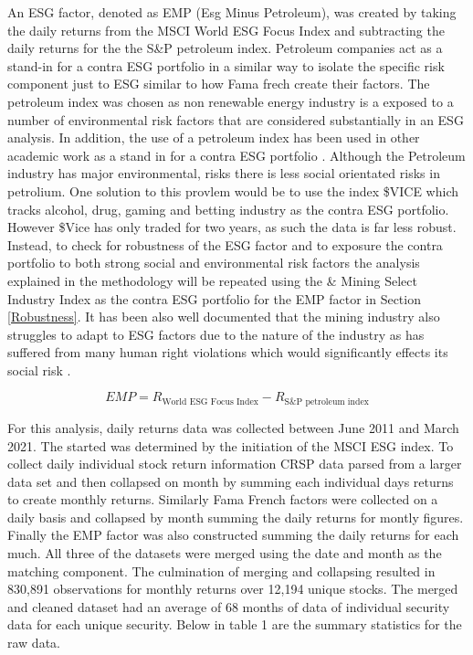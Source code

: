 \documentclass[12pt,oneside,reqno]{amsart}
\begin{document}
An ESG factor, denoted as EMP (Esg Minus Petroleum), was created by taking the daily returns from the MSCI World ESG Focus Index and subtracting the daily returns for the the  S\&P petroleum index. Petroleum companies act as a stand-in for a contra ESG portfolio in a similar way to isolate the specific risk component just to ESG similar to how Fama frech create their factors. The  petroleum index was chosen as non renewable energy industry is a exposed to a number of environmental risk factors that are considered substantially in an ESG analysis. In addition, the use of a petroleum index has been used in other academic work as a stand in for a contra ESG portfolio \cite{Frynas2005TheFD}. Although the Petroleum industry has major environmental, risks there is less social orientated risks in petrolium. One solution to this provlem would be to use the index \$VICE which tracks alcohol, drug, gaming and betting industry  as the  contra ESG portfolio. However \$Vice has only traded for two years, as such the data is far less robust. Instead, to check for robustness of the ESG factor and to exposure the contra portfolio to both strong social and environmental risk factors the analysis explained in the methodology will be repeated using the \& Mining Select Industry Index as the contra ESG portfolio for the EMP factor in Section \ref{Robustness}. It has been also well documented that the mining industry also struggles to adapt to ESG factors due to the nature of the industry as has suffered from many human right violations which would significantly effects its social risk  \cite{Kapelus2002MiningCS}.

\begin{equation}
    \label{making_EMP}
    EMP = R_{\text{World ESG Focus Index}}- R_{\text{S\&P petroleum index}}
\end{equation}

For this analysis, daily returns data was collected between June 2011 and March 2021. The started was determined by the initiation of the MSCI ESG index. To collect daily individual stock return information CRSP data parsed from a larger data set and then collapsed on month by summing each individual days returns to create monthly returns. Similarly Fama French factors were collected on a daily basis and collapsed by month summing the daily returns for montly figures. Finally the EMP factor was also  constructed summing the daily returns for each much. All three of the datasets were merged using the date and month as the matching component. The culmination of merging and collapsing resulted in  830,891 observations for monthly returns over  12,194 unique stocks. The merged and cleaned dataset had an average of 68 months of data of individual security data for each unique security. Below in table 1 are the summary statistics for the raw data.
\end{document}

